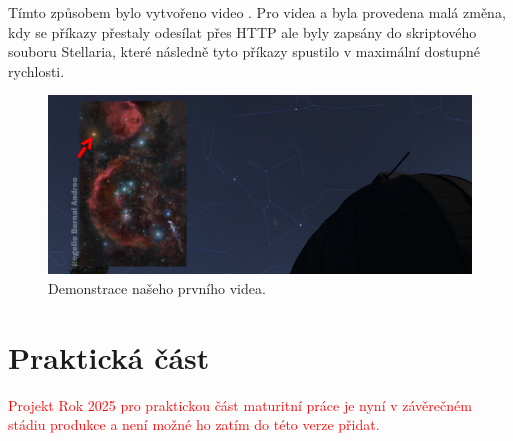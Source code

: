 \documentclass[12pt,a4paper,titlepage]{article}
\begin{document}
Tímto způsobem bylo vytvořeno video . Pro videa  a  byla provedena malá změna, kdy se příkazy přestaly odesílat přes HTTP ale byly zapsány do skriptového souboru Stellaria, které následně tyto příkazy spustilo v maximální dostupné rychlosti.
\begin{figure}[ht]
	\centering
	\includegraphics[width=.85\textwidth]{unor.png}
	\caption{Demonstrace našeho prvního videa.}\label{img:unor}
\end{figure}
\newpage
\part{Praktická část}
\textcolor{red}{Projekt Rok 2025 pro praktickou část maturitní práce je nyní v závěrečném stádiu produkce a není možné ho zatím do této verze přidat.}
\end{document}
